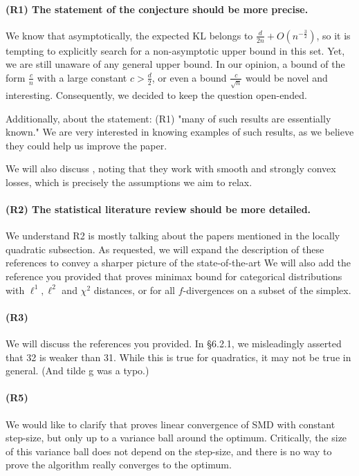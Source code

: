 \paragraph{(R1) The statement of the conjecture should be more precise.}
We know that asymptotically, the expected KL belongs to $\frac{d}{2 n} + O (n^{-\frac{3}{2}})$, so it is tempting to explicitly search for a non-asymptotic upper bound in this set. 
Yet, we are still unaware of any general upper bound.
In our opinion, a bound of the form $\frac{c}{n}$ with a large constant $c>\frac{d}{2}$, or even a bound $\frac{c}{\sqrt{n}}$ would be novel and interesting.
Consequently, we decided to keep the question open-ended.  

Additionally, about the statement: (R1) "many of such results are essentially known."
We are very interested in knowing examples of such   results, as we believe they could help us improve the paper.

We will also discuss \citet{frostig2015competing}, noting that they work with smooth and strongly convex losses, which is precisely the assumptions we aim to relax.

\paragraph{(R2) The statistical literature review should be more detailed.}
We understand R2 is mostly talking about the papers mentioned in the locally quadratic subsection. 
As requested, we will expand the description of these references to convey a sharper picture of the state-of-the-art
We will also add the reference you provided that proves minimax bound for categorical distributions with $\ell^1, \ell^2$ and $\chi^2$ distances, or for all $f$-divergences on a subset of the simplex. 

\paragraph{(R3)} We will discuss the references you provided. In \S6.2.1, we misleadingly asserted that 32 is weaker than 31. While this is true for quadratics, it may not be true in general. (And tilde g was a typo.)

\paragraph{(R5)} We would like to clarify that \citet{dorazio2021stochastic} proves linear convergence of SMD with constant step-size, but only up to a variance ball around the optimum.
Critically, the size of this variance ball does not depend on the step-size, and there is no way to prove the algorithm really converges to the optimum. 

